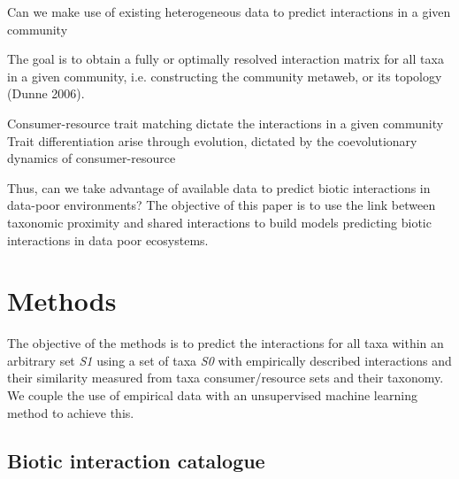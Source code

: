 \documentclass[letterpaper]{article}
\begin{document}


  Can we make use of existing heterogeneous data to predict interactions in a given community %

The goal is to obtain a fully or optimally resolved interaction matrix for all taxa in a given community, i.e. constructing the community metaweb, or its topology (Dunne 2006).



  Consumer-resource trait matching dictate the interactions in a given community
  Trait differentiation arise through evolution, dictated by the coevolutionary dynamics of consumer-resource


  Thus, can we take advantage of available data to predict biotic interactions in data-poor environments? The objective of this paper is to use the link between taxonomic proximity and shared interactions to build models predicting biotic interactions in data poor ecosystems.


\section{Methods}
The objective of the methods is to predict the interactions for all taxa within an arbitrary set \textit{S1} using a set of taxa \textit{S0} with empirically described interactions and their similarity measured from taxa consumer/resource sets and their taxonomy. We couple the use of empirical data with an unsupervised machine learning method to achieve this.

 \subsection{Biotic interaction catalogue}
\end{document}
